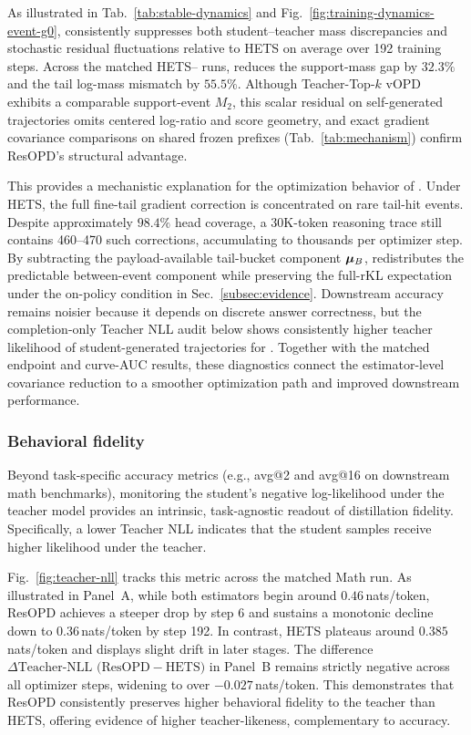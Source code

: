 As illustrated in Tab.~\ref{tab:stable-dynamics} and Fig.~\ref{fig:training-dynamics-event-g0}, \method{} consistently suppresses both student--teacher mass discrepancies and stochastic residual fluctuations relative to HETS on average over 192 training steps. Across the matched HETS--\method{} runs, \method{} reduces the support-mass gap by $32.3\%$ and the tail log-mass mismatch by $55.5\%$.
Although Teacher-Top-$k$ vOPD exhibits a comparable support-event $M_2$, this scalar residual on self-generated trajectories omits centered log-ratio and score geometry, and exact gradient covariance comparisons on shared frozen prefixes (Tab.~\ref{tab:mechanism}) confirm ResOPD's structural advantage.

This provides a mechanistic explanation for the optimization behavior of \method{}. Under HETS, the full fine-tail gradient correction is concentrated on rare tail-hit events. Despite approximately $98.4\%$ head coverage, a $30\text{K}$-token reasoning trace still contains 460--470 such corrections, accumulating to thousands per optimizer step. By subtracting the payload-available tail-bucket component $\bm{\mu}_B$, \method{} redistributes the predictable between-event component while preserving the full-rKL expectation under the on-policy condition in Sec.~\ref{subsec:evidence}. Downstream accuracy remains noisier because it depends on discrete answer correctness, but the completion-only Teacher NLL audit below shows consistently higher teacher likelihood of student-generated trajectories for \method{}. Together with the matched endpoint and curve-AUC results, these diagnostics connect the estimator-level covariance reduction to a smoother optimization path and improved downstream performance.

\vspace{-4mm}
\subsubsection{Behavioral fidelity}
\label{sec:math-eval-diagnostics}

Beyond task-specific accuracy metrics (e.g., avg@2 and avg@16 on downstream math benchmarks), monitoring the student's negative log-likelihood under the teacher model provides an intrinsic, task-agnostic readout of distillation fidelity. Specifically, a lower Teacher NLL indicates that the student samples receive higher likelihood under the teacher.

Fig.~\ref{fig:teacher-nll} tracks this metric across the matched Math run. As illustrated in Panel~A, while both estimators begin around $0.46$\,nats/token, ResOPD achieves a steeper drop by step 6 and sustains a monotonic decline down to $0.36$\,nats/token by step 192. In contrast, HETS plateaus around $0.385$\,nats/token and displays slight drift in later stages. The difference $\Delta\text{Teacher-NLL (ResOPD} - \text{HETS)}$ in Panel~B remains strictly negative across all optimizer steps, widening to over $-0.027$\,nats/token. This demonstrates that ResOPD consistently preserves higher behavioral fidelity to the teacher than HETS, offering evidence of higher teacher-likeness, complementary to accuracy.

